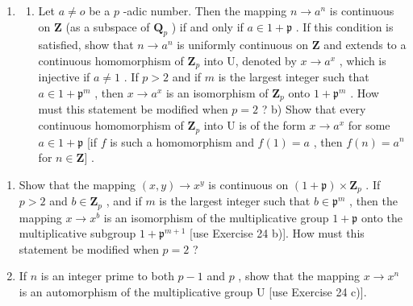 \begin{enumerate}
\def\labelenumi{(\arabic{enumi})}
\setcounter{enumi}{24}
\tightlist
\item
  \begin{enumerate}
  \def\labelenumii{\alph{enumii})}
  \tightlist
  \item
    Let \(a \neq o\) be a \(p\) -adic number. Then the mapping \(n \to a^n\) is continuous on \(\mathbf{Z}\) (as a subspace of \(\mathbf{Q}_p\) ) if and only if \(a \in 1 + \mathfrak{p}\) . If this condition is satisfied, show that \(n \to a^n\) is uniformly continuous on \(\mathbf{Z}\) and extends to a continuous homomorphism of \(\mathbf{Z}_p\) into U, denoted by \(x \to a^x\) , which is injective if \(a \neq 1\) . If \(p > 2\) and if \(m\) is the largest integer such that \(a \in 1 + \mathfrak{p}^m\) , then \(x \to a^x\) is an isomorphism of \(\mathbf{Z}_p\) onto \(1 + \mathfrak{p}^m\) . How must this statement be modified when \(p = 2\) ? b) Show that every continuous homomorphism of \(\mathbf{Z}_p\) into U is of the form \(x \to a^x\) for some \(a \in 1 + \mathfrak{p}\) {[}if \(f\) is such a homomorphism and \(f(1) = a\) , then \(f(n) = a^n\) for \(n \in \mathbf{Z}]\) .
  \end{enumerate}
\end{enumerate}

\begin{enumerate}
\def\labelenumi{\alph{enumi})}
\setcounter{enumi}{2}
\item
  Show that the mapping \((x, y) \to x^y\) is continuous on \((1 + \mathfrak{p}) \times \mathbf{Z}_p\) . If \(p > 2\) and \(b \in \mathbf{Z}_p\) , and if \(m\) is the largest integer such that \(b \in \mathfrak{p}^m\) , then the mapping \(x \to x^b\) is an isomorphism of the multiplicative group \(1 + \mathfrak{p}\) onto the multiplicative subgroup \(1 + \mathfrak{p}^{m+1}\) {[}use Exercise 24 b){]}. How must this statement be modified when \(p = 2\) ?
\item
  If \(n\) is an integer prime to both \(p - 1\) and \(p\) , show that the mapping \(x \to x^n\) is an automorphism of the multiplicative group U {[}use Exercise 24 c){]}.
\end{enumerate}


